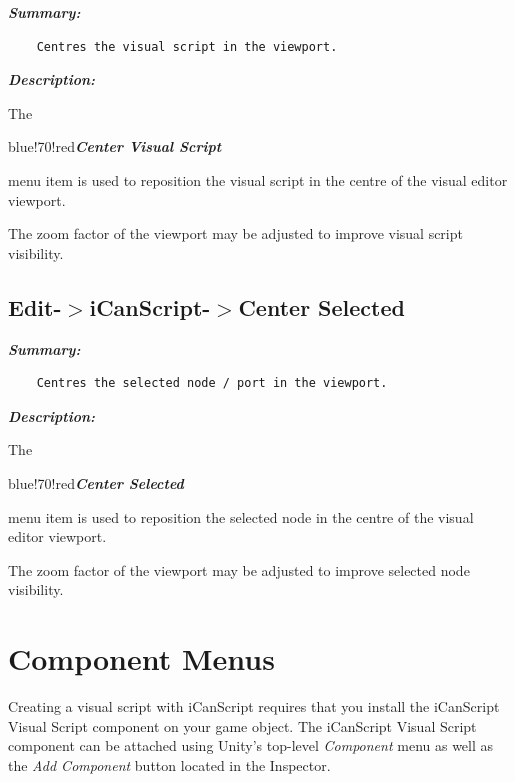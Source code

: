 \emph{\textbf{Summary:}}

\begin{verbatim}
    Centres the visual script in the viewport.
\end{verbatim}

\emph{\textbf{Description:}}

The \begin{color}{blue!70!red}\emph{\textbf{Center Visual Script}}\end{color} menu item is used to reposition the visual script in the centre of the visual editor viewport.

The zoom factor of the viewport may be adjusted to improve visual script visibility.

\subsection{Edit-$>$iCanScript-$>$Center Selected}
\label{edit-icanscript-centerselected}

\emph{\textbf{Summary:}}

\begin{verbatim}
    Centres the selected node / port in the viewport.
\end{verbatim}

\emph{\textbf{Description:}}

The \begin{color}{blue!70!red}\emph{\textbf{Center Selected}}\end{color} menu item is used to reposition the selected node in the centre of the visual editor viewport.

The zoom factor of the viewport may be adjusted to improve selected node visibility.

\section{Component Menus}
\label{componentmenus}

Creating a visual script with iCanScript requires that you install the iCanScript Visual Script component on your game object. The iCanScript Visual Script component can be attached using Unity's top-level \emph{Component} menu as well as the \emph{Add Component} button located in the Inspector.

